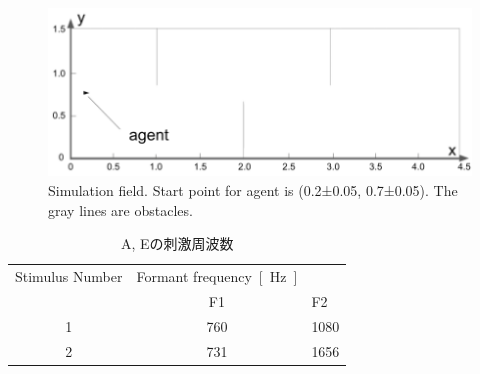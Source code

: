 \documentclass{jsreport}
\begin{document}
\newpage
{}
\begin{figure}[H]
  \centering
  \vfill
  \includegraphics[width=15cm]{figures/simulation_field.png}
  \caption{
    Simulation field.
    Start point for agent is (0.2±0.05, 0.7±0.05).
    The gray lines are obstacles.
  }\label{fig:simulation_field}
\end{figure}

\newpage
{}
\begin{table}[H]
  \caption{A, Eの刺激周波数}\label{tab:ae}
  \centering
    \begin{tabular}{c|cl}
      Stimulus Number & Formant frequency\SI{}{[\hertz]} \\
          & F1 & F2 \\ \hline
      1 & 760 & 1080 \\
      2 & 731 & 1656\\
    \end{tabular}
\end{table}
\end{document}
